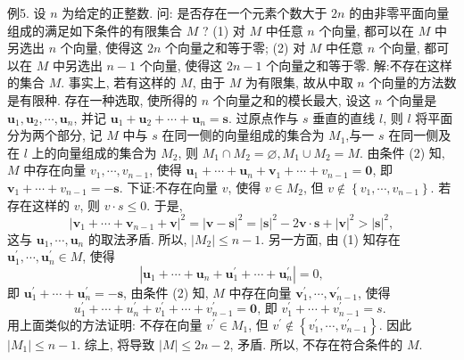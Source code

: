 例5. 设 $n$ 为给定的正整数.
问: 是否存在一个元素个数大于 $2 n$ 的由非零平面向量组成的满足如下条件的有限集合 $M$ ?
(1) 对 $M$ 中任意 $n$ 个向量, 都可以在 $M$ 中另选出 $n$ 个向量, 使得这 $2 n$ 个向量之和等于零;
(2) 对 $M$ 中任意 $n$ 个向量, 都可以在 $M$ 中另选出 $n-1$ 个向量, 使得这 $2 n-1$ 个向量之和等于零.
解:不存在这样的集合 $M$.
事实上, 若有这样的 $M$, 由于 $M$ 为有限集, 故从中取 $n$ 个向量的方法数是有限种.
存在一种选取, 使所得的 $n$ 个向量之和的模长最大, 设这 $n$ 个向量是 $\boldsymbol{u}_1, \boldsymbol{u}_2, \cdots, \boldsymbol{u}_n$, 并记 $\boldsymbol{u}_1+\boldsymbol{u}_2+\cdots+\boldsymbol{u}_n=\boldsymbol{s}$.
过原点作与 $s$ 垂直的直线 $l$, 则 $l$ 将平面分为两个部分, 记 $M$ 中与 $s$ 在同一侧的向量组成的集合为 $M_1$,与一 $s$ 在同一侧及在 $l$ 上的向量组成的集合为 $M_2$, 则 $M_1 \cap M_2=\varnothing, M_1 \cup M_2=M$.
由条件 (2) 知, $M$ 中存在向量 $v_1, \cdots, v_{n-1}$, 使得 $\boldsymbol{u}_1+\cdots+\boldsymbol{u}_n+\boldsymbol{v}_1+\cdots+ v_{n-1}=\mathbf{0}$, 即 $\boldsymbol{v}_1+\cdots+v_{n-1}=-\boldsymbol{s}$.
下证:不存在向量 $v$, 使得 $v \in M_2$, 但 $v \notin\left\{v_1, \cdots, v_{n-1}\right\}$.
若存在这样的 $v$, 则 $v \cdot s \leqslant 0$. 于是,
$$
\left|\boldsymbol{v}_1+\cdots+\boldsymbol{v}_{n-1}+\boldsymbol{v}\right|^2=|\boldsymbol{v}-\boldsymbol{s}|^2=|\boldsymbol{s}|^2-2 \boldsymbol{v} \cdot \boldsymbol{s}+|\boldsymbol{v}|^2>|\boldsymbol{s}|^2,
$$
这与 $\boldsymbol{u}_1, \cdots, \boldsymbol{u}_n$ 的取法矛盾.
所以, $\left|M_2\right| \leqslant n-1$.
另一方面, 由 (1) 知存在 $\boldsymbol{u}_1^{\prime}, \cdots, \boldsymbol{u}_n^{\prime} \in M$, 使得
$$
\left|\boldsymbol{u}_1+\cdots+\boldsymbol{u}_n+\boldsymbol{u}_1^{\prime}+\cdots+\boldsymbol{u}_n^{\prime}\right|=0,
$$
即 $\boldsymbol{u}_1^{\prime}+\cdots+\boldsymbol{u}_n^{\prime}=-\boldsymbol{s}$, 由条件 (2) 知, $M$ 中存在向量 $\boldsymbol{v}_1^{\prime}, \cdots, \boldsymbol{v}_{n-1}^{\prime}$, 使得
$$
u_1^{\prime}+\cdots+u_n^{\prime}+v_1^{\prime}+\cdots+v_{n-1}^{\prime}=\mathbf{0} \text {, 即 } v_1^{\prime}+\cdots+v_{n-1}^{\prime}=s \text {. }
$$
用上面类似的方法证明: 不存在向量 $v^{\prime} \in M_1$, 但 $v^{\prime} \notin\left\{v_1^{\prime}, \cdots, v_{n-1}^{\prime}\right\}$. 因此 $\left|M_1\right| \leqslant n-1$.
综上, 将导致 $|M| \leqslant 2 n-2$, 矛盾.
所以, 不存在符合条件的 $M$.



